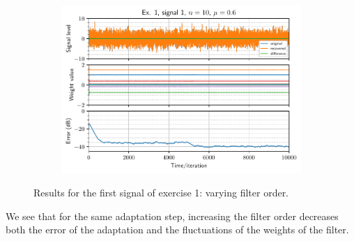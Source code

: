 \begin{figure}[h]
\begin{subfigure}[t]{0.30\columnwidth}
        \includegraphics[width=\columnwidth]{figures/pdf/ex1_l1_n10_mu60.pdf}
        \caption{}
    \end{subfigure}
    \caption{Results for the first signal of exercise 1: varying filter
        order.\label{fig:ex1varyorder}}
\end{figure}
We see that for the same adaptation step, increasing the filter order decreases
both the error of the adaptation and the fluctuations of the weights of the
filter.

